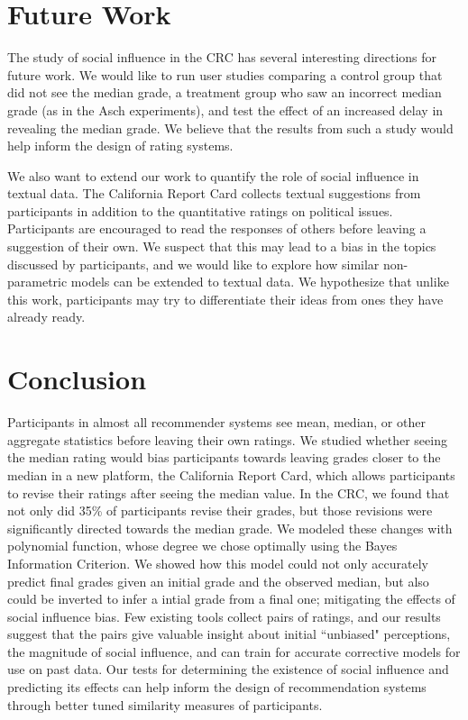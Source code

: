 \section{Future Work}
The study of social influence in the CRC has several interesting directions for future work.
We would like to run user studies comparing a control group that did not see the median grade, 
a treatment group who saw an incorrect median grade (as in the Asch experiments), and test the effect of an increased delay in revealing the median grade.
We believe that the results from such a study would help inform the design of rating systems.
 
We also want to extend our work to quantify the role of social influence in textual data. 
The California Report Card collects textual suggestions from participants in addition to the quantitative ratings on political issues. 
Participants are encouraged to read the responses of others before leaving a suggestion of their own.
We suspect that this may lead to a bias in the topics discussed by participants, and we would like to explore how similar non-parametric models can be extended to textual data.
We hypothesize that unlike this work, participants may try to differentiate their ideas from ones they have already ready.
\section{Conclusion}
Participants in almost all recommender systems see mean, median, or other aggregate statistics before leaving their own ratings.
We studied whether seeing the median rating would bias participants towards leaving grades closer to the median in a new platform, the California Report Card, which allows participants to revise their ratings after seeing the median value.
In the CRC, we found that not only did 35\% of participants revise their grades, but those revisions were significantly directed towards the median grade.
We modeled these changes with polynomial function, whose degree we chose optimally using the Bayes Information Criterion.
We showed how this model could not only accurately predict final grades given an initial grade and the observed median, but also could be inverted to infer a intial grade from a final one; mitigating the effects of social influence bias.
Few existing tools collect pairs of ratings, and our results suggest that the pairs give valuable insight about initial ``unbiased" perceptions, the magnitude of social influence, and can train for accurate corrective models for use on past data.
Our tests for determining the existence of social influence and predicting its effects can help inform the design of recommendation systems through better tuned similarity measures of participants.


